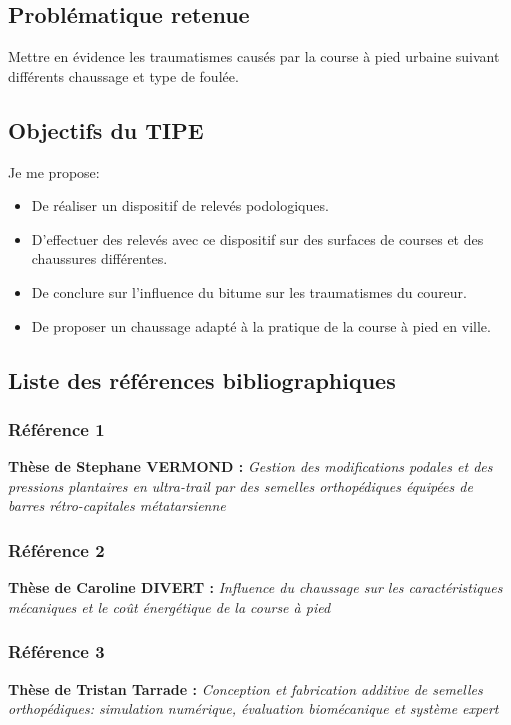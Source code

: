 \documentclass[11pt]{article}
\begin{document}
\subsection{Problématique retenue}
\label{sec:org6655d88}
Mettre en évidence les traumatismes causés par la course à pied urbaine suivant différents chaussage et type de foulée.\\\empty
\subsection{Objectifs du TIPE}
\label{sec:org0e1de9c}
Je me propose:\\\empty
\begin{itemize}
\item De réaliser un dispositif de relevés podologiques.\\\empty
\item D'effectuer des relevés avec ce dispositif sur des surfaces de courses et des chaussures différentes.\\\empty
\item De conclure sur l'influence du bitume sur les traumatismes du coureur.\\\empty
\item De proposer un chaussage adapté à la pratique de la course à pied en ville.\\\empty
\end{itemize}

\subsection{Liste des références bibliographiques}
\label{sec:orgde49bd5}
\subsubsection{Référence 1}
\label{sec:orgfc704ab}
\textbf{Thèse de Stephane VERMOND :} \emph{Gestion des modifications podales et des pressions plantaires en ultra-trail par des semelles orthopédiques équipées de barres rétro-capitales métatarsienne}\\\empty
\subsubsection{Référence 2}
\label{sec:org74a0c5a}
\textbf{Thèse de Caroline DIVERT :} \emph{Influence du chaussage sur les caractéristiques mécaniques et le coût énergétique de la course à pied}\\\empty
\subsubsection{Référence 3}
\label{sec:org8032945}
\textbf{Thèse de Tristan Tarrade :} \emph{Conception et fabrication additive de semelles orthopédiques: simulation numérique, évaluation biomécanique et système expert}\\\empty
\end{document}
